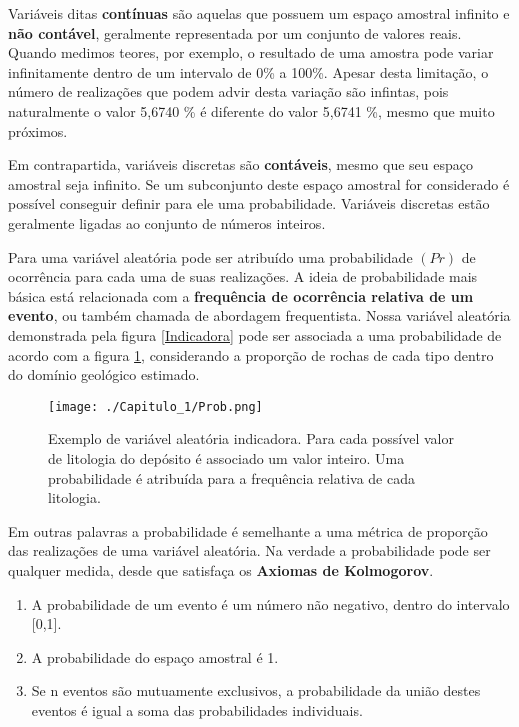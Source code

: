  Variáveis ditas \textbf{contínuas} são aquelas que possuem um espaço amostral infinito e  \textbf{não contável},  geralmente representada por um conjunto de valores reais. Quando medimos teores, por exemplo, o resultado de uma amostra pode variar infinitamente dentro de um intervalo de 0\% a 100\%. Apesar desta limitação, o número de realizações que podem advir desta variação são infintas, pois naturalmente o valor 5,6740 \% é diferente do valor 5,6741 \%, mesmo que muito próximos.
 
 Em contrapartida, variáveis discretas são \textbf{contáveis}, mesmo que seu espaço amostral seja infinito. Se um subconjunto deste espaço amostral for considerado é possível conseguir definir para ele uma probabilidade. Variáveis discretas estão geralmente ligadas ao conjunto de números inteiros.
 
  Para uma variável aleatória pode ser atribuído uma probabilidade $(Pr)$ de ocorrência para cada uma de suas realizações. A ideia de probabilidade mais básica está relacionada com a \textbf{frequência de ocorrência relativa de um evento}, ou também chamada de abordagem frequentista. Nossa variável aleatória demonstrada pela figura \ref{Indicadora} pode ser associada a uma probabilidade de acordo com a figura \ref{Prob}, considerando a proporção de rochas de cada tipo dentro do domínio geológico estimado. 
  
  \FloatBarrier
  \begin{figure}[!htb]
  	\centering
  	\texttt{[image: ./Capitulo\_1/Prob.png]}	
  	\caption{Exemplo de variável aleatória indicadora. Para cada possível valor de litologia do depósito é associado um valor inteiro. Uma probabilidade é atribuída para a frequência relativa de cada litologia. }
  	\label{Prob}
  \end{figure}
  \FloatBarrier
  
  Em outras palavras a probabilidade é semelhante a uma métrica de proporção das realizações de uma variável aleatória. Na verdade a probabilidade pode ser qualquer medida, desde que satisfaça os \textbf{Axiomas de Kolmogorov}. 
  
  \begin{enumerate}
  	\item A probabilidade de um evento é um número não negativo, dentro do intervalo [0,1].
  	\item A probabilidade do espaço amostral é 1.
  	\item Se n eventos são mutuamente exclusivos, a probabilidade da união destes eventos é igual a soma das probabilidades individuais.
  \end{enumerate}
  
